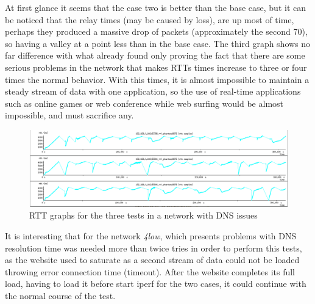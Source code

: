 At first glance it seems that the case two is better than the base case, but
it can be noticed that the relay times (may be caused by loss), are up most of time,
perhaps they produced a massive drop of packets (approximately the second 70),
so having a valley at a point less than in the base case. The third graph
shows no far difference with what already found only proving the fact that
there are some serious problems in the network that makes RTTs times increase
to three or four times the normal behavior. With this times, it is almost
impossible to maintain a steady stream of data with one application, so the
use of real-time applications such as online games or web conference while web
surfing would be almost impossible, and must sacrifice any.

\begin{figure}[ht]
\centering
    \includegraphics[width=\textwidth]{img/n_iperf_4low}
\caption[Iperf: RTT graphs for a network with DNS issues]{RTT graphs for the three tests in a network with DNS issues}
\label{fig:iperf4low}
\end{figure}%

It is interesting that for the network \emph{4low}, which presents problems with DNS resolution time was needed more than twice tries in order to perform this tests, as the website used to saturate as a second stream of data could not be loaded throwing error connection time (timeout). After the website completes its full load, having to load it before start iperf for the two cases, it could continue with the normal course of the test.
